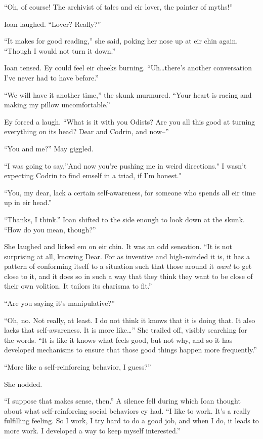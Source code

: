 ``Oh, of course! The archivist of tales and eir lover, the painter of myths!''

Ioan laughed. ``Lover? Really?''

``It makes for good reading,'' she said, poking her nose up at eir chin again. ``Though I would not turn it down.''

Ioan tensed. Ey could feel eir cheeks burning. ``Uh\ldots there's another conversation I've never had to have before.''

``We will have it another time,'' the skunk murmured. ``Your heart is racing and making my pillow uncomfortable.''

Ey forced a laugh. ``What is it with you Odists? Are you all this good at turning everything on its head? Dear and Codrin, and now--''

``You and me?'' May giggled.

``I was going to say,''And now you're pushing me in weird directions." I wasn't expecting Codrin to find emself in a triad, if I'm honest."

``You, my dear, lack a certain self-awareness, for someone who spends all eir time up in eir head.''

``Thanks, I think.'' Ioan shifted to the side enough to look down at the skunk. ``How do you mean, though?''

She laughed and licked em on eir chin. It was an odd sensation. ``It is not surprising at all, knowing Dear. For as inventive and high-minded it is, it has a pattern of conforming itself to a situation such that those around it \emph{want} to get close to it, and it does so in such a way that they think they want to be close of their own volition. It tailors its charisma to fit.''

``Are you saying it's manipulative?''

``Oh, no. Not really, at least. I do not think it knows that it is doing that. It also lacks that self-awareness. It is more like\ldots{}'' She trailed off, visibly searching for the words. ``It is like it knows what feels good, but not why, and so it has developed mechanisms to ensure that those good things happen more frequently.''

``More like a self-reinforcing behavior, I guess?''

She nodded.

``I suppose that makes sense, then.'' A silence fell during which Ioan thought about what self-reinforcing social behaviors ey had. ``I like to work. It's a really fulfilling feeling. So I work, I try hard to do a good job, and when I do, it leads to more work. I developed a way to keep myself interested.''


